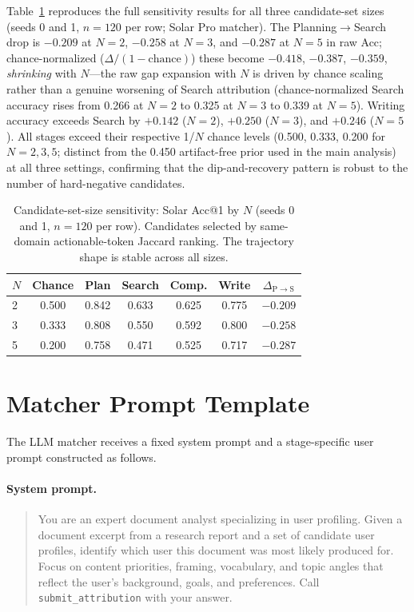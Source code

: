 \documentclass[]{article}
\begin{document}
Table~\ref{tab:sensitivity_full} reproduces the full sensitivity results
for all three candidate-set sizes (seeds 0 and 1, $n=120$ per row; Solar Pro matcher).
The Planning$\rightarrow$Search drop is $-0.209$ at $N=2$, $-0.258$ at $N=3$,
and $-0.287$ at $N=5$ in raw Acc; chance-normalized
($\Delta / (1-\text{chance})$) these become $-0.418$, $-0.387$, $-0.359$,
\emph{shrinking} with $N$---the raw gap expansion with $N$ is driven by
chance scaling rather than a genuine worsening of Search attribution
(chance-normalized Search accuracy rises from 0.266 at $N=2$ to 0.325
at $N=3$ to 0.339 at $N=5$).
Writing accuracy exceeds Search by $+0.142$ ($N=2$),
$+0.250$ ($N=3$), and $+0.246$ ($N=5$). All stages exceed their respective 1/$N$ chance levels (0.500, 0.333,
0.200 for $N{=}2,3,5$; distinct from the 0.450 artifact-free prior used
in the main analysis) at all three settings, confirming that the
dip-and-recovery pattern is robust to the number of hard-negative candidates.

\begin{table}[!ht]
\centering
\small
\begin{tabular}{lcccccc}
\toprule
$N$ & \textbf{Chance} & \textbf{Plan} & \textbf{Search} & \textbf{Comp.} & \textbf{Write} & \textbf{$\Delta_{\mathrm{P}{\to}\mathrm{S}}$} \\
\midrule
2 & 0.500 & 0.842 & 0.633 & 0.625 & 0.775 & $-0.209$ \\
3 & 0.333 & 0.808 & 0.550 & 0.592 & 0.800 & $-0.258$ \\
5 & 0.200 & 0.758 & 0.471 & 0.525 & 0.717 & $-0.287$ \\
\bottomrule
\end{tabular}
\caption{Candidate-set-size sensitivity: Solar Acc@1 by $N$ (seeds 0 and 1, $n=120$
  per row). Candidates selected by same-domain actionable-token Jaccard
  ranking. The trajectory shape is stable across all sizes.}
\label{tab:sensitivity_full}
\end{table}

\section{Matcher Prompt Template}
\label{app:prompt}

The LLM matcher receives a fixed system prompt and a stage-specific user
prompt constructed as follows.

\paragraph{System prompt.}
\begin{quote}
\small
You are an expert document analyst specializing in user profiling.
Given a document excerpt from a research report and a set of candidate
user profiles, identify which user this document was most likely produced
for. Focus on content priorities, framing, vocabulary, and topic angles
that reflect the user's background, goals, and preferences.
Call \texttt{submit\_attribution} with your answer.
\end{quote}
\end{document}
